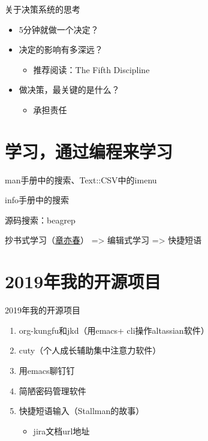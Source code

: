 \documentclass[presentation,dvipdfmx,CJKbookmarks]{beamer}
\begin{document}
\begin{CJK*}{UTF8}{simsun}
\begin{frame}[label={sec:orgd141101}]{关于决策系统的思考}
\begin{itemize}
\item 5\thinspace 分钟就做一个决定？
\item 决定的影响有多深远？
\begin{itemize}
\item 推荐阅读：The Fifth Discipline
\end{itemize}
\item 做决策，最关键的是什么？
\pause
\begin{itemize}
\item 承担责任
\end{itemize}
\end{itemize}
\end{frame}


\section{学习，通过编程来学习}
\label{sec:orgad25478}

\begin{frame}[label={sec:org1fb11b3}]{}
\begin{block}{man\thinspace 手册中的搜索、Text::CSV\thinspace 中的\thinspace imenu}
\end{block}
\begin{block}{info\thinspace 手册中的搜索}
\end{block}
\begin{block}{源码搜索：beagrep}
\end{block}
\begin{block}{抄书式学习（\href{https://www.zhihu.com/question/28951394}{章亦春}） => 编辑式学习 => 快捷短语}
\end{block}
\end{frame}

\section{2019\thinspace 年我的开源项目}
\label{sec:org81fb648}
\begin{frame}[label={sec:org3e7cafd}]{2019\thinspace 年我的开源项目}
\begin{enumerate}
\item org-kungfu\thinspace 和\thinspace jkd（用\thinspace emacs\thinspace + cli\thinspace 操作\thinspace altassian\thinspace 软件）
\item cuty（个人成长辅助集中注意力软件）
\item 用\thinspace emacs\thinspace 聊钉钉
\item 简陋密码管理软件
\item 快捷短语输入（Stallman\thinspace 的故事）
\begin{itemize}
\item jira\thinspace 文档\thinspace url\thinspace 地址
\end{itemize}
\end{enumerate}
\end{frame}


\end{CJK*}
\end{document}
